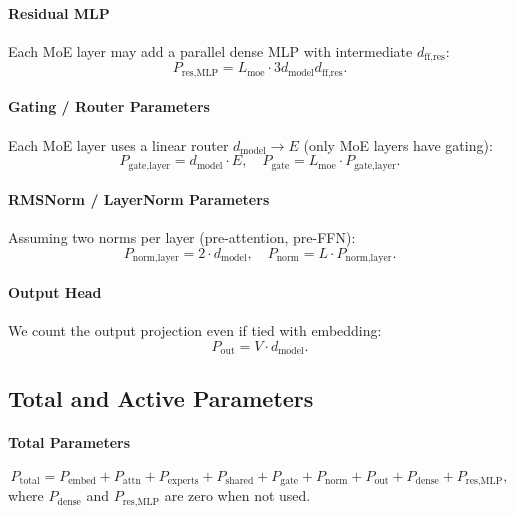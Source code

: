 \documentclass[11pt]{article}
\begin{document}
\paragraph{Residual MLP}
Each MoE layer may add a parallel dense MLP with intermediate $d_{\text{ff,res}}$:
\[
P_{\text{res,MLP}} = L_{\text{moe}} \cdot 3 d_{\text{model}} d_{\text{ff,res}}.
\]

\paragraph{Gating / Router Parameters}
Each MoE layer uses a linear router $d_{\text{model}} \to E$ (only MoE layers have gating):
\[
P_{\text{gate,layer}} = d_{\text{model}} \cdot E,
\quad
P_{\text{gate}} = L_{\text{moe}} \cdot P_{\text{gate,layer}}.
\]

\paragraph{RMSNorm / LayerNorm Parameters}
Assuming two norms per layer (pre-attention, pre-FFN):
\[
P_{\text{norm,layer}} = 2 \cdot d_{\text{model}},
\quad
P_{\text{norm}} = L \cdot P_{\text{norm,layer}}.
\]

\paragraph{Output Head}
We count the output projection even if tied with embedding:
\[
P_{\text{out}} = V \cdot d_{\text{model}}.
\]

\subsection{Total and Active Parameters}

\paragraph{Total Parameters}
\[
P_{\text{total}} =
P_{\text{embed}} + P_{\text{attn}} + P_{\text{experts}} + P_{\text{shared}}
+ P_{\text{gate}} + P_{\text{norm}} + P_{\text{out}}
+ P_{\text{dense}} + P_{\text{res,MLP}},
\]
where $P_{\text{dense}}$ and $P_{\text{res,MLP}}$ are zero when not used.
\end{document}
